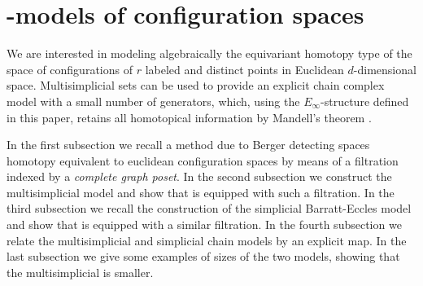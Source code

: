 
\section{\pdfEinfty-models of configuration spaces}

We are interested in modeling algebraically the equivariant homotopy type of the space of configurations of $r$ labeled and distinct points in Euclidean $d$-dimensional space.
Multisimplicial sets can be used to provide an explicit chain complex model with a small number of generators, which, using the $E_\infty$-structure defined in this paper, retains all homotopical information by Mandell's theorem \cite{mandell2006homotopy_type}.

In the first subsection we recall a method due to Berger detecting spaces homotopy equivalent to euclidean configuration spaces by means of a filtration indexed by a {\em complete graph poset}.
In the second subsection we construct the multisimplicial model and show that is equipped with such a filtration.
In the third subsection we recall the construction of the simplicial Barratt-Eccles model and show that is equipped with a similar filtration.
In the fourth subsection we relate the multisimplicial and simplicial chain models by an explicit map. In the last subsection we give some examples of sizes of the two models, showing that the multisimplicial is smaller.







